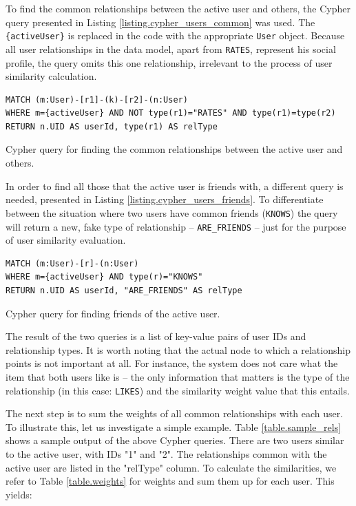 \documentclass[12pt]{report}
\begin{document}
To find the common relationships between the active user and others, the Cypher query presented in Listing \ref{listing.cypher_users_common} was used. The \texttt{\{active\-User\}} is replaced in the code with the appropriate \texttt{User} object. Because all user relationships in the data model, apart from \texttt{RATES}, represent his social profile, the query omits this one relationship, irrelevant to the process of user similarity calculation.

\begin{listing}
\begin{verbatim}
MATCH (m:User)-[r1]-(k)-[r2]-(n:User)
WHERE m={activeUser} AND NOT type(r1)="RATES" AND type(r1)=type(r2) 
RETURN n.UID AS userId, type(r1) AS relType
\end{verbatim}
\caption{Cypher query for finding the common relationships between the active user and others.}
\label{listing.cypher_users_common}
\end{listing}

In order to find all those that the active user is friends with, a different query is needed, presented in Listing \ref{listing.cypher_users_friends}. To differentiate between the situation where two users have common friends (\texttt{KNOWS}) the query will return a new, fake type of relationship -- \texttt{ARE\_FRIENDS} -- just for the purpose of user similarity evaluation.

\begin{listing}
\begin{verbatim}
MATCH (m:User)-[r]-(n:User)
WHERE m={activeUser} AND type(r)="KNOWS"
RETURN n.UID AS userId, "ARE_FRIENDS" AS relType
\end{verbatim}
\caption{Cypher query for finding friends of the active user.}
\label{listing.cypher_users_friends}
\end{listing}

The result of the two queries is a list of key-value pairs of user IDs and relationship types. It is worth noting that the actual node to which a relationship points is not important at all. For instance, the system does not care what the item that both users like is -- the only information that matters is the type of the relationship (in this case: \texttt{LIKES}) and the similarity weight value that this entails.

\hbox{}
The next step is to sum the weights of all common relationships with each user. To illustrate this, let us investigate a simple example. Table \ref{table.sample_rels} shows a sample output of the above Cypher queries. There are two users similar to the active user, with IDs "1" and "2". The relationships common with the active user are listed in the "relType" column. To calculate the similarities, we refer to Table \ref{table.weights} for weights and sum them up for each user. This yields:
\end{document}
